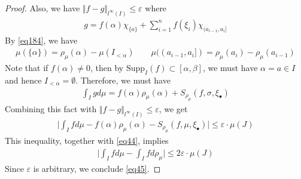\documentclass[12pt,b5paper,notitlepage]{article}
\theoremstyle{definition}
\newtheorem{rem}[df]{Remark}
\theoremstyle{plain}
\newcommand{\blt}{\bullet}
\newcommand{\Rbb}{\mathbb R}
\newcommand{\Supp}{\mathrm{Supp}}
\newcommand{\eps}{\varepsilon}
\numberwithin{equation}{section}
\begin{document}
\begin{proof}
Also, we have $\Vert f-g\Vert_{l^\infty(I)}\leq\eps$ where
\begin{align*}
g=f(\alpha)\chi_{\{a\}}+\sum_{i=1}^n f(\xi_i)\chi_{(a_{i-1},a_i]}
\end{align*}
By \eqref{eq184}, we have
\begin{align*}
\mu(\{\alpha\})=\rho_\mu(\alpha)-\mu(I_{<\alpha})\qquad \mu((a_{i-1},a_i])=\rho_\mu(a_i)-\rho_\mu(a_{i-1})
\end{align*}
Note that if $f(\alpha)\neq 0$, then by $\Supp_I(f)\subset[\alpha,\beta]$, we must have $\alpha=a\in I$ and hence $I_{<\alpha}=\emptyset$. Therefore, we must have
\begin{align*}
\int_I gd\mu=f(\alpha)\rho_\mu(\alpha)+ S_{\rho_\mu}(f,\sigma,\xi_\blt)
\end{align*}
Combining this fact with $\Vert f-g\Vert_{l^\infty(I)}\leq\eps$, we get
\begin{align*}
\Big| \int_I fd\mu-f(\alpha)\rho_\mu(\alpha)-S_{\rho_\mu}(f,\mu,\xi_\blt)\Big|\leq \eps\cdot\mu(J)
\end{align*}
This inequality, together with \eqref{eq44}, implies
\begin{align*}
\Big| \int_I fd\mu-\int_I fd\rho_\mu\Big|\leq 2\eps\cdot\mu(J)
\end{align*}
Since $\eps$ is arbitrary, we conclude \eqref{eq45}.
\end{proof}







\begin{comment}
\begin{rem}
There is a bijection between:
\begin{itemize}
\item An increasing right-continuous function $\rho:(a,b]\rightarrow\Rbb_{\geq0}$.
\item An increasing right-continuous function $\varrho:[a,b]\rightarrow\Rbb_{\geq0}$.
\end{itemize}
They are related by
\begin{align}
\rho=\varrho|_{(a,b]}
\end{align}
Equivalently, viewing $\rho$ as a function on $[a,b]$ (cf. Conv. \ref{lb10}),
\begin{align}
\rho=\varrho-\varrho(a)\cdot\chi_{\{a\}}\qquad 
\end{align}
Since $\rho=\varrho-\varrho(a)+\varrho(a)\chi_{(a,b]}$ and $\int_a^b fd\chi_{(a,b]}=f(a)$, by Rem. \ref{lb6}, we have
\begin{align}
\int_a^b fd\rho=f(a)\varrho(a)+\int_a^bfd\varrho
\end{align}
These relations allow us to convert the setting of \cite[Sec. 25.7]{Gui-A}, which uses $\varrho$ to present the Riesz representation theorem, to the current setting.
\end{rem}
\end{comment}
\end{document}
